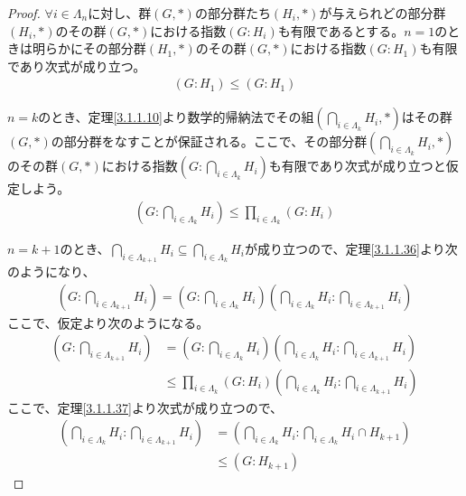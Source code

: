 \documentclass[dvipdfmx]{jsarticle}
\begin{document}
\begin{proof}
$\forall i \in \varLambda_{n}$に対し、群$(G,*)$の部分群たち$\left( H_{i},* \right)$が与えられどの部分群$\left( H_{i},* \right)$のその群$(G,*)$における指数$\left( G:H_{i} \right)$も有限であるとする。$n = 1$のときは明らかにその部分群$\left( H_{1},* \right)$のその群$(G,*)$における指数$\left( G:H_{1} \right)$も有限であり次式が成り立つ。
\begin{align*}
\left( G:H_{1} \right) \leq \left( G:H_{1} \right)
\end{align*}\par
$n = k$のとき、定理\ref{3.1.1.10}より数学的帰納法でその組$\left( \bigcap_{i \in \varLambda_{k}} H_{i},* \right)$はその群$(G,*)$の部分群をなすことが保証される。ここで、その部分群$\left( \bigcap_{i \in \varLambda_{k}} H_{i},* \right)$のその群$(G,*)$における指数$\left( G:\bigcap_{i \in \varLambda_{k}} H_{i} \right)$も有限であり次式が成り立つと仮定しよう。
\begin{align*}
\left( G:\bigcap_{i \in \varLambda_{k}} H_{i} \right) \leq \prod_{i \in \varLambda_{k}} \left( G:H_{i} \right)
\end{align*}\par
$n = k + 1$のとき、$\bigcap_{i \in \varLambda_{k + 1}} H_{i} \subseteq \bigcap_{i \in \varLambda_{k}} H_{i}$が成り立つので、定理\ref{3.1.1.36}より次のようになり、
\begin{align*}
\left( G:\bigcap_{i \in \varLambda_{k + 1}} H_{i} \right) = \left( G:\bigcap_{i \in \varLambda_{k}} H_{i} \right)\left( \bigcap_{i \in \varLambda_{k}} H_{i}:\bigcap_{i \in \varLambda_{k + 1}} H_{i} \right)
\end{align*}
ここで、仮定より次のようになる。
\begin{align*}
\left( G:\bigcap_{i \in \varLambda_{k + 1}} H_{i} \right) &= \left( G:\bigcap_{i \in \varLambda_{k}} H_{i} \right)\left( \bigcap_{i \in \varLambda_{k}} H_{i}:\bigcap_{i \in \varLambda_{k + 1}} H_{i} \right)\\
&\leq \prod_{i \in \varLambda_{k}} \left( G:H_{i} \right)\left( \bigcap_{i \in \varLambda_{k}} H_{i}:\bigcap_{i \in \varLambda_{k + 1}} H_{i} \right)
\end{align*}
ここで、定理\ref{3.1.1.37}より次式が成り立つので、
\begin{align*}
\left( \bigcap_{i \in \varLambda_{k}} H_{i}:\bigcap_{i \in \varLambda_{k + 1}} H_{i} \right) &= \left( \bigcap_{i \in \varLambda_{k}} H_{i}:\bigcap_{i \in \varLambda_{k}} H_{i} \cap H_{k + 1} \right)\\
&\leq \left( G:H_{k + 1} \right)

\end{align*}
\end{proof}
\end{document}
